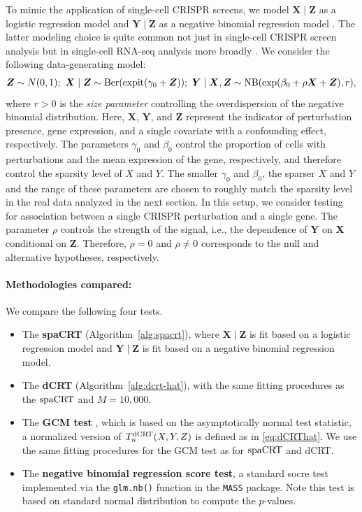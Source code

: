 \documentclass[12pt]{article}
\theoremstyle{definition}
\newcommand{\expit}{\mathrm{expit}}                 	%
\newcommand{\prx}{\bm X}								%
\newcommand{\srx}{X}									%
\newcommand{\prz}{\bm Z}								%
\newcommand{\pry}{{\bm Y}}								%
\newcommand{\sry}{Y}									%
\newcommand{\dCRT}{\textnormal{dCRT}} 					%
\newcommand{\spacrt}{\textnormal{spaCRT}}               %
\begin{document}
To mimic the application of single-cell CRISPR screens, we model $\prx\mid\prz$ as a logistic regression model and $\pry\mid\prz$ as a negative binomial regression model \citep{Barry2024,Katsevich2020c,Gasperini2019a}. The latter modeling choice is quite common not just in single-cell CRISPR screen analysis but in single-cell RNA-seq analysis more broadly \citep{Huang2018, Townes2019, Svensson2020}. We consider the following data-generating model:
\small
\begin{align}\label{eq:simulation-model-CRISPR-screens}
  \bm Z\sim N(0,1); \	\bm X \mid \bm Z\sim \textnormal{Ber}(\expit(\gamma_0+\bm Z));\ \bm Y \mid \bm X,\bm Z\sim \textnormal{NB}(\exp(\beta_0+\rho\bm X+\bm Z),r),
\end{align}
\normalsize
where $r > 0$ is the \textit{size parameter} controlling the overdispersion of the negative binomial distribution. Here, $\prx$, $\pry$, and $\prz$ represent the indicator of perturbation presence, gene expression, and a single covariate with a confounding effect, respectively. The parameters $\gamma_0$ and $\beta_0$ control the proportion of cells with perturbations and the mean expression of the gene, respectively, and therefore control the sparsity level of $\srx$ and $\sry$. The smaller $\gamma_0$ and $\beta_0$, the sparser $\srx$ and $\sry$ and the range of these parameters are chosen to roughly match the sparsity level in the real data analyzed in the next section. In this setup, we consider testing for association between a single CRISPR perturbation and a single gene. The parameter $\rho$ controls the strength of the signal, i.e., the dependence of $\pry$ on $\prx$ conditional on $\prz$. Therefore, $\rho = 0$ and $\rho \neq 0$ corresponds to the null and alternative hypotheses, respectively. 


\paragraph{Methodologies compared:}


We compare the following four tests.

\begin{itemize}
\item The \textbf{spaCRT} (Algorithm~\ref{alg:spacrt}), where $\prx \mid \prz$ is fit based on a logistic regression model and $\pry \mid \prz$ is fit based on a negative binomial regression model. 
\item The \textbf{dCRT} (Algorithm~\ref{alg:dcrt-hat}), with the same fitting procedures as the $\spacrt$ and $M = 10,000$.
\item The \textbf{GCM test} \citep{Shah2018}, which is based on the asymptotically normal test statistic, a normalized version of $T_n^{\dCRT}(X,Y,Z)$ is defined as in \eqref{eq:dCRThat}. We use the same fitting procedures for the GCM test as for $\spacrt$ and dCRT.
\item The \textbf{negative binomial regression score test}, a standard socre test implemented via the \verb|glm.nb()| function in the \verb|MASS| package. Note this test is based on standard normal distribution to compute the $p$-values.
\end{itemize}
\end{document}
